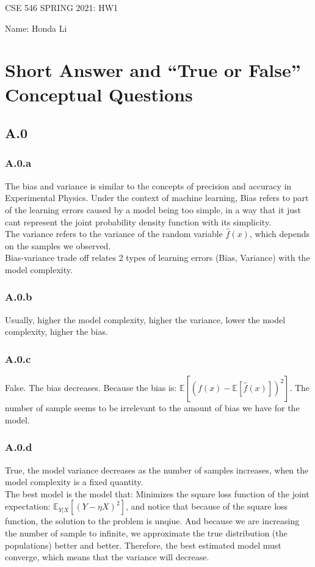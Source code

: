 \documentclass[]{article}
\begin{document}
\begin{center}
    CSE 546 SPRING 2021: HW1 
\end{center}
\begin{center}
    Name: Honda Li
\end{center}

\section*{Short Answer and ``True or False'' Conceptual Questions}
    \subsection*{A.0}
        \subsubsection*{A.0.a}
            The bias and variance is similar to the concepts of precision and accuracy in Experimental Physics. Under the context of machine learning, Bias refers to part of the learning errors caused by a model being too simple, in a way that it just cant represent the joint probability density function with its simplicity. 
            \\[1em]
            The variance refers to the variance of the random variable $\hat{f}(x)$, which depends on the samples we observed. 
            \\[1em]
            Bias-variance trade off relates 2 types of learning errors (Bias, Variance) with the model complexity. 
        \subsubsection*{A.0.b}
            Usually, higher the model complexity, higher the variance, lower the model complexity, higher the bias. 
        \subsubsection*{A.0.c}
            False. The bias decreases. Because the bias is: $\mathbb{E}\left[
                \left(
                f(x) - \mathbb{E}\left[\hat{f}(x)\right]
                \right)^2
            \right]$. The number of sample seems to be irrelevant to the amount of bias we have for the model. 
        \subsubsection*{A.0.d}
            True, the model variance decreases as the number of samples increases, when the model complexity is a fixed quantity.  
            \\
            The best model is the model that: Minimizes the square loss function of the joint expectation: $\mathbb{E}_{Y|X}\left[(Y - \eta{X})^2\right]$, and notice that because of the square loss function, the solution to the problem is unqiue. And because we are increasing the number of sample to infinite, we approximate the true distribution (the populations) better and better. Therefore, the best estimated model must converge, which means that the variance will decrease. 
\end{document}
